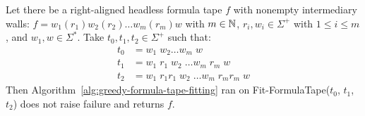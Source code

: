 

\begin{theorem}\label{th:greedy-formula-tape-fitting}
    Let there be a right-aligned headless formula tape $f$ with nonempty intermediary walls: $f = w_1 (r_1) w_2 (r_2)\dots w_m (r_m) w$ with $m\in\mathbb{N}$, $r_i, w_i \in \Sigma^+$ with $1 \leq i \leq m$, and $w_1, w \in \Sigma^*$. Take $t_0, t_1, t_2 \in \Sigma^+$ such that:
    \begin{align*}
        t_0 & = w_1\; w_2 \dots w_m\; w                       \\
        t_1 & = w_1\; r_1\; w_2\; \dots w_m\; r_m\; w         \\
        t_2 & = w_1\; r_1 r_1\; w_2\; \dots w_m\; r_m r_m\; w
    \end{align*}
    Then Algorithm~\ref{alg:greedy-formula-tape-fitting} ran on {\sc Fit-FormulaTape}($t_0$, $t_1$, $t_2$) does not raise failure and returns $f$.

\end{theorem}
